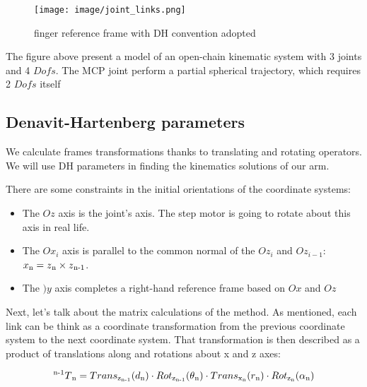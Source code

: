 \documentclass[conference]{IEEEtran}
\def\SP#1{\textsuperscript{\textcolor{black}{#1}}}
\def\SB#1{\textsubscript{\textcolor{black}{#1}}}
\begin{document}
   \begin{figure}[thpb]
      \centering
      \texttt{[image: image/joint\_links.png]}
      \caption{finger reference frame with DH convention adopted}
      \label{fig:abstract_model_3}
   \end{figure}

The figure above present a model of an open-chain kinematic system with 3 joints and 4 $Dofs$. The MCP joint perform a partial spherical trajectory, which requires 2 $Dofs$ itself

   




\subsection{Denavit-Hartenberg parameters}
We calculate frames transformations thanks to translating and rotating operators. We will use DH parameters in finding the kinematics solutions of our arm.

There are some constraints in the initial orientations of the coordinate systems:
  \begin{itemize}
  	\item The $Oz$ axis is the joint's axis. The step motor is going to rotate about this axis in real life.
  	\item The $Ox_i$ axis is parallel to the common normal of the $Oz_i$ and $Oz_{i-1}$: $x\SB{n}=z\SB{n} \times z\SB{n-1}$.
  	\item The $)y$ axis completes a right-hand reference frame based on $Ox$ and $Oz$
  \end{itemize}

Next, let's talk about the matrix calculations of the method. As mentioned, each link can be think as a coordinate transformation from the previous coordinate system to the next coordinate system. That transformation is then described as a product of translations along and rotations about x and z axes:
  \begin{center}
  	\begin{equation}
  		\SP{n-1}T\SB{n} = Trans\SB{z\SB{n-1}}(d\SB{n}) \cdot Rot\SB{z\SB{n-1}}(\theta\SB{n}) \cdot Trans\SB{x\SB{n}}(r\SB{n}) \cdot Rot\SB{z\SB{n}}(\alpha\SB{n})
  	\end{equation}
  \end{center}
  
\end{document}
